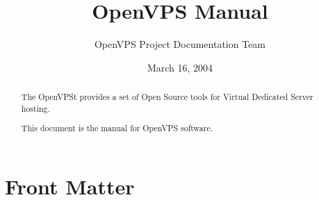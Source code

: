 \documentclass{manual}
\title{OpenVPS Manual}
\author{OpenVPS Project Documentation Team}
\date{March 16, 2004}
\begin{document}
\maketitle

\ifhtml
\chapter*{Front Matter\label{front}}
\fi



\begin{abstract}

\noindent
The OpenVPSt provides a set of Open Source tools for Virtual
Dedicated Server hosting.

This document is the manual for OpenVPS software.

\begin{seealso}
\end{seealso}

\end{abstract}

\tableofcontents

\appendix


\end{document}
